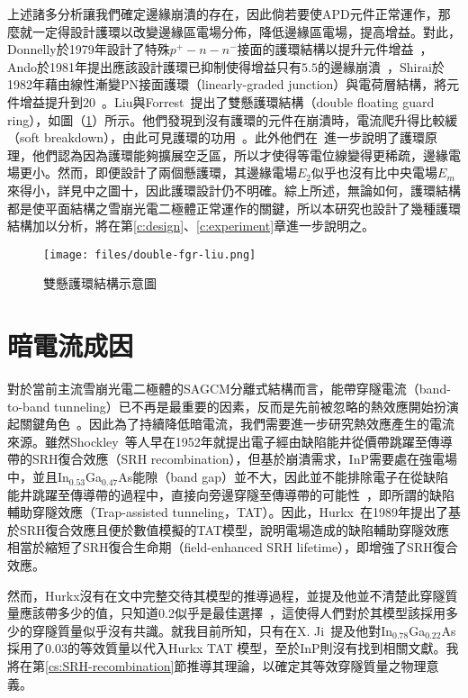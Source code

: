 上述諸多分析讓我們確定邊緣崩潰的存在，因此倘若要使APD元件正常運作，那麼就一定得設計護環以改變邊緣區電場分佈，降低邊緣區電場，提高增益。對此，Donnelly於1979年設計了特殊$p^+-n-n^-$接面的護環結構以提升元件增益~\cite{donnelly1979planar}，Ando於1981年提出應該設計護環已抑制使得增益只有$5.5$的邊緣崩潰~\cite{ando1981ingaas}，Shirai於1982年藉由線性漸變PN接面護環（linearly-graded junction）與電荷層結構，將元件增益提升到$20$~\cite{shirai1982planar}。Liu與Forrest~\cite{liu1988simple}\cite{liu1992planar}提出了雙懸護環結構（double floating guard ring），如圖（\ref{fig:double-fgr-liu}）所示。他們發現到沒有護環的元件在崩潰時，電流爬升得比較緩（soft breakdown），由此可見護環的功用~\cite{liu1988simple}。此外他們在~\cite{liu1992planar}進一步說明了護環原理，他們認為因為護環能夠擴展空乏區，所以才使得等電位線變得更稀疏，邊緣電場更小。然而，即便設計了兩個懸護環，其邊緣電場$E_2$似乎也沒有比中央電場$E_m$來得小，詳見\cite{liu1992planar}中之圖十，因此護環設計仍不明確。綜上所述，無論如何，護環結構都是使平面結構之雪崩光電二極體正常運作的關鍵，所以本研究也設計了幾種護環結構加以分析，將在第\ref{c:design}、\ref{c:experiment}章進一步說明之。

\begin{figure}[h]
\centering
\texttt{[image: files/double-fgr-liu.png]}
\caption[雙懸護環結構示意圖]{雙懸護環結構示意圖~\cite{liu1992planar}}
\label{fig:double-fgr-liu}
\end{figure}

\section{暗電流成因}
對於當前主流雪崩光電二極體的SAGCM分離式結構而言，能帶穿隧電流（band-to-band tunneling）已不再是最重要的因素，反而是先前被忽略的熱效應開始扮演起關鍵角色~\cite{Acerbi:2013bz}。因此為了持續降低暗電流，我們需要進一步研究熱效應產生的電流來源。雖然Shockley~\cite{shockley1952statistics}等人早在1952年就提出電子經由缺陷能井從價帶跳躍至傳導帶的SRH復合效應（SRH recombination），但基於崩潰需求，InP需要處在強電場中，並且In$_{0.53}$Ga$_{0.47}$As能隙（band gap）並不大，因此並不能排除電子在從缺陷能井跳躍至傳導帶的過程中，直接向旁邊穿隧至傳導帶的可能性~\cite{chynoweth1961excess}，即所謂的缺陷輔助穿隧效應（Trap-assisted tunneling，TAT）。因此，Hurkx~\cite{hurkx1989modelling}在1989年提出了基於SRH復合效應且便於數值模擬的TAT模型，說明電場造成的缺陷輔助穿隧效應相當於縮短了SRH復合生命期（field-enhanced SRH lifetime），即增強了SRH復合效應。

然而，Hurkx沒有在文中完整交待其模型的推導過程，並提及他並不清楚此穿隧質量應該帶多少的值，只知道0.2似乎是最佳選擇~\cite{hurkx1989modelling}，這使得人們對於其模型該採用多少的穿隧質量似乎沒有共識。就我目前所知，只有在X. Ji~\cite{ji2013deep}提及他對In$_{0.78}$Ga$_{0.22}$As採用了0.03的等效質量以代入Hurkx TAT 模型，至於InP則沒有找到相關文獻。我將在第\ref{cs:SRH-recombination}節推導其理論，以確定其等效穿隧質量之物理意義。

